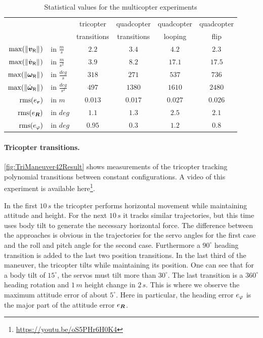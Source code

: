 \begin{table}[htb]
 \centering
 \setlength{\tabcolsep}{.1em}
 \begin{tabular}{rlcccc}
  \toprule
   && \quad tricopter\quad & \quad quadcopter\quad & \quad quadcopter\quad & \quad quadcopter\quad \\
   && \quad transitions \quad & \quad transitions \quad & \quad looping \quad & \quad flip \quad \\
  \midrule
  $\max(\| \boldsymbol{v}_{\mathsf{R}} \|_{})$  &in $\tfrac{\unit{m}}{\unit{s}}$     & $2.2$   & $3.4$   & $4.2$   & $2.3$ \\[.5ex]
  $\max(\| \dot{\boldsymbol{v}}_{\mathsf{R}} \|_{})$ &in $\tfrac{\unit{m}}{\unit{s}^2}$   & $3.9$   & $8.2$   & $17.1$   & $17.5$ \\[.5ex]
  $\max(\| \boldsymbol{\omega}_{\mathsf{R}} \|_{})$  &in $\tfrac{\unit{deg}}{\unit{s}}$   & $318$   & $271$   & $537$   & $736$ \\[.5ex]
  $\max(\| \dot{\boldsymbol{\omega}}_{\mathsf{R}} \|_{})$ &in $\tfrac{\unit{deg}}{\unit{s}^2}$ & $497$   & $1380$  & $1610$  & $2480$ 
  \\[1ex]
  $\operatorname{rms}(e_{\boldsymbol{r}})$      &in $\unit{m}$                       & $0.013$ & $0.017$ & $0.027$ & $0.026$ \\[.5ex]
  $\operatorname{rms}(e_{\boldsymbol{R}})$      &in $\unit{deg}$                     & $1.1$   & $1.3$   & $2.5$   & $2.1$   \\[.5ex]
  $\operatorname{rms}(e_{\varphi})$   &in $\unit{deg}$                     & $0.95$  & $0.3$   & $1.2$   & $0.8$   \\
  \bottomrule
 \end{tabular}
 \caption{Statistical values for the multicopter experiments}
 \label{tab:MulticopterExperimentStatistics}
\end{table}


\paragraph{Tricopter transitions.}
\autoref{fig:TriManeuver42Result} shows measurements of the tricopter tracking polynomial transitions between constant configurations.
A video of this experiment is available here\footnote{\url{https://youtu.be/oS5PHr6H0K4}}.

In the first $10\,\unit{s}$ the tricopter performs horizontal movement while maintaining attitude and height.
For the next $10\,\unit{s}$ it tracks similar trajectories, but this time uses body tilt to generate the necessary horizontal force.
The difference between the approaches is obvious in the trajectories for the servo angles for the first case and the roll and pitch angle for the second case.
Furthermore a $90^\circ$ heading transition is added to the last two position transitions.
In the last third of the maneuver, the tricopter tilts while maintaining its position.
One can see that for a body tilt of $15^\circ$, the servos must tilt more than $30^\circ$.
The last transition is a $360^\circ$ heading rotation and $1\,\unit{m}$ height change in $2\,\unit{s}$.
This is where we observe the maximum attitude error of about $5^\circ$.
Here in particular, the heading error $e_{\varphi}$ is the major part of the attitude error $e_{\boldsymbol{R}}$.

